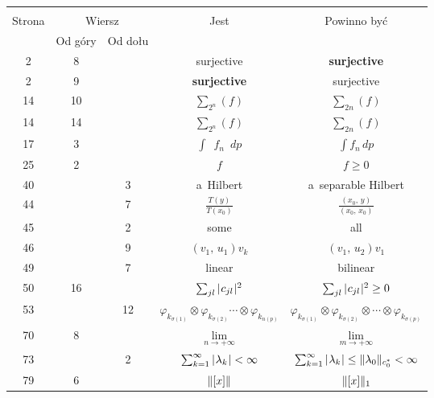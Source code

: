 \documentclass[a4paper,11pt]{article}
\begin{document}
\newpage
{}


\begin{center}
  \begin{tabular}{|c|c|c|c|c|}
    \hline
    & \multicolumn{2}{c|}{} & & \\
    Strona & \multicolumn{2}{c|}{Wiersz} & Jest
                              & Powinno być \\ \cline{2-3}
    & Od góry & Od dołu & & \\
    \hline
    2   &  8 & & surjective & \textbf{surjective} \\
    2   &  9 & & \textbf{surjective} & surjective \\
    14  & 10 & & $\sum_{ 2^{ n } }( f )$ & $\sum_{ 2 n }( f )$ \\
    14  & 14 & & $\sum_{ 2^{ n } }( f )$ & $\sum_{ 2 n }( f )$ \\
    17  &  3 & & $\int \;\: f_{ n } \;\: dp$ & $\int f_{ n } \, dp$ \\
    25  &  2 & & $f$ & $f \geq 0$ \\
    40  & & 3 & a~Hilbert & a~separable Hilbert \\
    44  & & 7 & $\frac{ T( y ) }{ T( x_{ 0 } ) }$
           & $\frac{ ( x_{ 0 }, \, y ) }{ ( x_{ 0 }, \, x_{ 0 } ) }$ \\
    45  & & 2 & some & all \\
    46  & & 9 & $( v_{ 1 }, \, u_{ 1 } ) v_{ k }$
           & $( v_{ 1 }, \, u_{ 2 } ) v_{ 1 }$ \\
    49  & & 7 & linear & bilinear \\
    50  & 16 & & $\sum_{ j l } | \hspace{0.05em}  c_{ j l }  \hspace{0.05em} |^{ 2 }$
           & $\sum_{ j l } | \hspace{0.05em}  c_{ j l }  \hspace{0.05em} |^{ 2 } \geq 0$ \\
    53  & & 12 & $\varphi_{ k_{ \sigma( 1 ) } } \otimes \varphi_{ k_{ \sigma( 2 ) } }
                 \cdots \otimes \varphi_{ k_{ n( p ) } }$
           & $\varphi_{ k_{ \sigma( 1 ) } } \otimes \varphi_{ k_{ \sigma( 2 ) } } \otimes
             \cdots \otimes \varphi_{ k_{ \sigma( p ) } }$ \\
    70  & 8 & & $\lim\limits_{ n \to +\infty }$ & $\lim\limits_{ m \to +\infty }$ \\
    73  & & 2 & $\sum_{ k = 1 }^{ \infty } | \hspace{0.05em}  \lambda_{ k }  \hspace{0.05em} | < \infty$
           & $\sum_{ k = 1 }^{ \infty } | \hspace{0.05em}  \lambda_{ k }  \hspace{0.05em} | \leq
             \lVert{  \lambda_{ 0 }  }\rVert_{ c_{ 0 }^{ * } } < \infty$ \\
    79  & 6 & & $\lVert{  [x]  }\rVert$ & $\lVert{  [x]  }\rVert_{ 1 }$ \\

\end{tabular}
\end{center}
\end{document}

